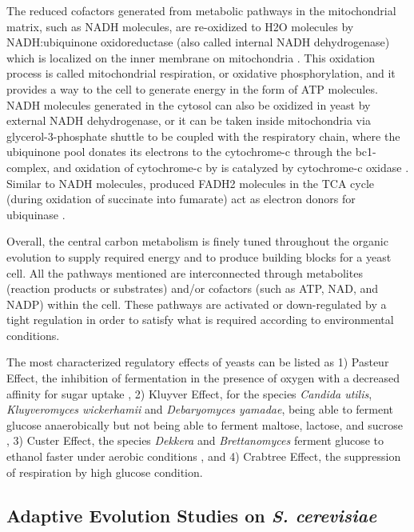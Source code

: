 The reduced cofactors generated from metabolic pathways in the mitochondrial matrix, such as NADH molecules, are re-oxidized to H2O molecules by NADH:ubiquinone oxidoreductase (also called internal NADH dehydrogenase) which is localized on the inner membrane on mitochondria \cite{bakker2001stoichiometry}. This oxidation process is called mitochondrial respiration, or oxidative phosphorylation, and it provides a way to the cell to generate energy in the form of ATP molecules. NADH molecules generated in the cytosol can also be oxidized in yeast by external NADH dehydrogenase, or it can be taken inside mitochondria via glycerol-3-phosphate shuttle to be coupled with the respiratory chain, where the ubiquinone pool donates \cite{zitomer1979transcriptional} its electrons to the cytochrome-c through the bc1-complex, and oxidation of cytochrome-c by is catalyzed by cytochrome-c oxidase \cite{de1987mitochondrial}. Similar to NADH molecules, produced FADH2 molecules in the TCA cycle (during oxidation of succinate into fumarate) act as electron donors for ubiquinase \cite{cimini2009global}.

Overall, the central carbon metabolism is finely tuned throughout the organic evolution to supply required energy and to produce building blocks for a yeast cell. All the pathways mentioned are interconnected through metabolites (reaction products or substrates) and/or cofactors (such as ATP, NAD, and NADP) within the cell. These pathways are activated or down-regulated by a tight regulation in order to satisfy what is required according to environmental conditions.

The most characterized regulatory effects of yeasts can be listed as 1) Pasteur Effect, the inhibition of fermentation in the presence of oxygen with a decreased affinity for sugar uptake \cite{lagunas1983role}, 2) Kluyver Effect, for the species \emph{Candida utilis}, \emph{Kluyveromyces wickerhamii} and \emph{Debaryomyces yamadae}, being able to ferment glucose anaerobically but not being able to ferment maltose, lactose, and sucrose \cite{kaliterna1995transient}, 3) Custer Effect, the species \emph{Dekkera} and \emph{Brettanomyces} ferment glucose to ethanol faster under aerobic conditions \cite{scheffers1966stimulation}, and 4) Crabtree Effect, the suppression of respiration by high glucose condition.



\subsection{Adaptive Evolution Studies on \emph{S. cerevisiae}}

